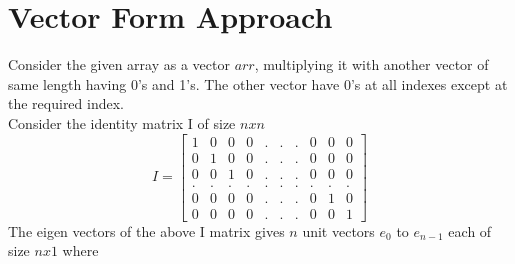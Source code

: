 \documentclass[journal,12pt,twocolumn]{IEEEtran}
\begin{document}
\section{Vector Form Approach}
Consider the given array as a vector $arr$, multiplying it with another vector of same length having 0's and 1's. 
The other vector have 0's at all indexes except at the required index.
\\
Consider the identity matrix I of size $nxn$
\\
\[I = 
	\begin{bmatrix}
		1 & 0 & 0 & 0 & . & . & . & 0 & 0 & 0
		\\
		0 & 1 & 0 & 0 & . & . & . & 0 & 0 & 0
		\\
		0 & 0 & 1 & 0 & . & . & . & 0 & 0 & 0
		\\
		. & . & . & . & . & . & . & . & . & .
		\\
		0 & 0 & 0 & 0 & . & . & . & 0 & 1 & 0
		\\
		0 & 0 & 0 & 0 & . & . & . & 0 & 0 & 1
	\end{bmatrix}
\]
The eigen vectors of the above I matrix gives $n$ unit vectors $e_{0}$ to $e_{n-1}$ each of size $nx1$ where
\\
\end{document}
